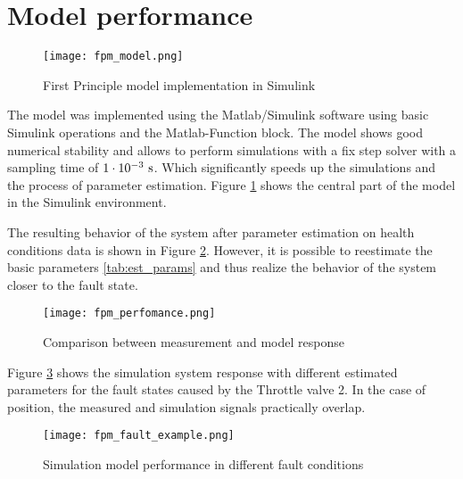 \section{Model performance}

\begin{figure}[h!]
    \centering
    \texttt{[image: fpm\_model.png]}
    \caption{First Principle model implementation in Simulink}
    \label{fig:fpm_simulink}
\end{figure}

The model was implemented using the Matlab/Simulink software using basic
Simulink operations and the Matlab-Function block. The model shows good
numerical stability and allows to perform simulations with a fix step
solver with a sampling time of $1\cdot 10^{-3} \rm\ s$. Which significantly speeds up the
simulations and the process of parameter estimation. Figure
\ref{fig:fpm_simulink} shows
the central part of the model in the Simulink environment.


The resulting behavior of the system after parameter estimation on health
conditions data is shown in Figure \ref{fig:fpm_perfomance}. However, it is
possible to reestimate the basic parameters \ref{tab:est_params} and thus
realize the behavior of the system closer to the fault state.

\begin{figure}[!ht]
    \centering
    \texttt{[image: fpm\_perfomance.png]}
    \caption{Comparison between measurement and model response}
    \label{fig:fpm_perfomance}
\end{figure}


Figure \ref{fig:fpm_fault_example} shows the simulation system
response with different estimated parameters for the fault states caused by
the Throttle valve 2. In the case of position, the measured and simulation
signals practically overlap.

\begin{figure}[!ht]
    \centering
    \texttt{[image: fpm\_fault\_example.png]}
    \caption{Simulation model performance in different fault conditions}
    \label{fig:fpm_fault_example}
\end{figure}

